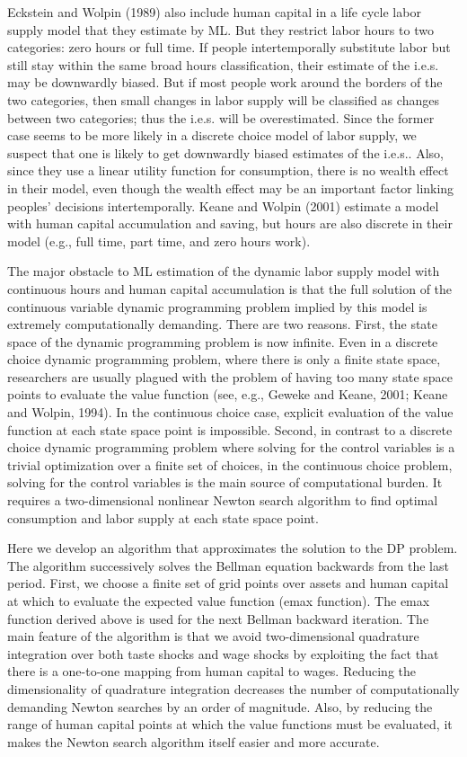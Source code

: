 \documentclass{article}
\begin{document}
Eckstein and Wolpin (1989) also include human capital in a life cycle labor supply model that they estimate by ML. But they restrict labor hours to two categories: zero hours or full time. If people intertemporally substitute labor but still stay within the same broad hours classification, their estimate of the i.e.s. may be downwardly biased. But if most people work around the borders of the two categories, then small changes in labor supply will be classified as changes between two categories; thus the i.e.s. will be overestimated. Since the former case seems to be more likely in a discrete choice model of labor supply, we suspect that one is likely to get downwardly biased estimates of the i.e.s.. Also, since they use a linear utility function for consumption, there is no wealth effect in their model, even though the wealth effect may be an important factor linking peoples' decisions intertemporally. Keane and Wolpin (2001) estimate a model with human capital accumulation and saving, but hours are also discrete in their model (e.g., full time, part time, and zero hours work). \par
The major obstacle to ML estimation of the dynamic labor supply model with continuous hours and human capital accumulation is that the full solution of the continuous variable dynamic programming problem implied by this model is extremely computationally demanding. There are two reasons. First, the state space of the dynamic programming problem is now infinite. Even in a discrete choice dynamic programming problem, where there is only a finite state space, researchers are usually plagued with the problem of having too many state space points to evaluate the value function (see, e.g., Geweke and Keane, 2001; Keane and Wolpin, 1994). In the continuous choice case, explicit evaluation of the value function at each state space point is impossible. Second, in contrast to a discrete choice dynamic programming problem where solving for the control variables is a trivial optimization over a finite set of choices, in the continuous choice problem, solving for the control variables is the main source of computational burden. It requires a two-dimensional nonlinear Newton search algorithm to find optimal consumption and labor supply at each state space point. \par
Here we develop an algorithm that approximates the solution to the DP problem. The algorithm successively solves the Bellman equation backwards from the last period. First, we choose a finite set of grid points over assets and human capital at which to evaluate the expected value function (emax function). The emax function derived above is used for the next Bellman backward iteration. The main feature of the algorithm is that we avoid two-dimensional quadrature integration over both taste shocks and wage shocks by exploiting the fact that there is a one-to-one mapping from human capital to wages. Reducing the dimensionality of quadrature integration decreases the number of computationally demanding Newton searches by an order of magnitude. Also, by reducing the range of human capital points at which the value functions must be evaluated, it makes the Newton search algorithm itself easier and more accurate. \par
\end{document}

